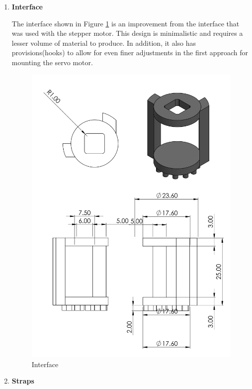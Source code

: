 \begin{enumerate}
\begin{enumerate}
      \par
    \item \textbf{Interface}
    \par
    The interface shown in Figure \ref{fig:interface2} is an improvement from the interface that was used with the stepper motor. This design is minimalistic and requires a lesser volume of material to produce. In addition, it also has provisions(hooks) to allow for even finer adjustments in the first approach for mounting the servo motor.
    \begin{figure}[H]
        \centering
        \includegraphics[height=.5\textheight]{Figures/Interface2.PNG}
        \caption{Interface}
        \label{fig:interface2}
    \end{figure}
    \par
    \item \textbf{Straps}
    \par

\end{enumerate}
\end{enumerate}
